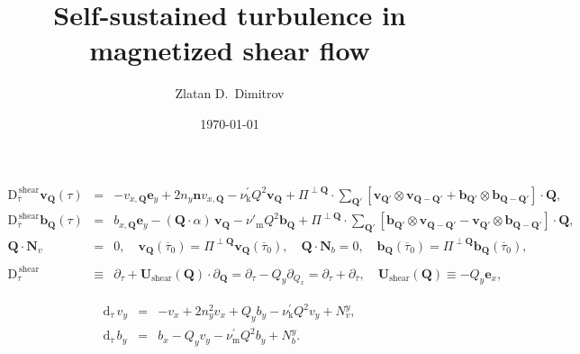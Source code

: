 \documentclass[a4paper,11pt]{article}
\begin{document}
\title{Self-sustained turbulence in magnetized shear flow}
\author{Zlatan D.~Dimitrov}
\date{\today}

\maketitle

\begin{eqnarray}
\mathrm{D}_{\overline{\tau}}^{\mathrm{\,shear}}\mathbf{v}_\mathbf{Q}(\tau) &=&
-v_{x,\mathbf{Q}}\mathbf{e}_y + 2n_y\mathbf{n}v_{x,\mathbf{Q}}
-\nu^\prime_\mathrm{k}Q^2\mathbf{v}_\mathbf{Q} + \Pi^{\perp\mathbf{Q}}\cdot\sum_{\mathbf{Q}'}\left[\mathbf{v}_{\mathbf{Q}'}\otimes\mathbf{v}_{\mathbf{Q}
-\mathbf{Q}'} + \mathbf{b}_{\mathbf{Q}'}\otimes\mathbf{b}_{\mathbf{Q}-\mathbf{Q}'}\right]\cdot\mathbf{Q},
\label{VelocityEvolution}
\\
\label{MagneticEvolution}
\mathrm{D}_{\overline{\tau}}^{\mathrm{\,shear}}\mathbf{b}_\mathbf{Q}(\tau) &=& b_{x,\mathbf{Q}}\mathbf{e}_y
-(\mathbf{Q}\cdot{\alpha})\,\mathbf{v}_\mathbf{Q} -\nu'_\mathrm{m}Q^2\mathbf{b}_\mathbf{Q} + \Pi^{\perp\mathbf{Q}}\cdot\sum_{\mathbf{Q}'}\left[\mathbf{b}_{\mathbf{Q}'}\otimes\mathbf{v}_{\mathbf{Q}
-\mathbf{Q}'} - \mathbf{v}_{\mathbf{Q}'}\otimes\mathbf{b}_{\mathbf{Q}-\mathbf{Q}'}\right]\cdot\mathbf{Q}, 
\\
\mathbf{Q} \cdot \mathbf{N}_v &=& 0, \quad \mathbf{v}_\mathbf{Q}(\overline{\tau}_0)=\Pi^{\perp\mathbf{Q}}\mathbf{v}_\mathbf{Q}(\overline{\tau}_0),\quad
\mathbf{Q}\cdot \mathbf{N}_b=0, \quad \mathbf{b}_\mathbf{Q}(\overline{\tau}_0)=\Pi^{\perp\mathbf{Q}}\mathbf{b}_\mathbf{Q}(\overline{\tau}_0),\nonumber 
\\
\\
\label{ushear}
\mathrm{D}_\tau^{\mathrm{\,shear}} &\equiv& \partial_\tau+\mathbf{U}_{\mathrm{shear}}(\mathbf{Q})\cdot\partial_{\mathbf{Q}}=\partial_\tau-Q_y\partial_{Q_x}= \partial_\tau + \partial_{\overline{\tau}},\quad
\mathbf{U}_\mathrm{shear}(\mathbf{Q})\equiv-Q_y\mathbf{e}_x, 
\end{eqnarray}

\begin{eqnarray}
 \mathrm{d}_{\overline{\tau}}\, v_y &=& -v_x + 2 n_y^2 v_x + Q_yb_y - \nu^\prime_\mathrm{k}Q^2v_y + N_v^y, \\
 \mathrm{d}_{\overline{\tau}}\, b_y &=& b_x  -Q_yv_y -\nu^\prime_\mathrm{m}Q^2b_y + N_b^y.
\end{eqnarray}
\end{document}

